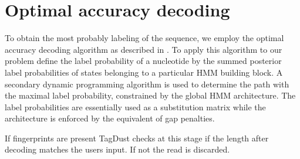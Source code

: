 \documentclass[11pt,a4paper,oneside]{book}
\begin{document}
\section{Optimal accuracy decoding} 

To obtain the most probably labeling of the sequence, we employ the optimal accuracy decoding algorithm as described in \citep{Kall:2005vg}. To apply this algorithm to our problem define the label probability of a nucleotide by the summed posterior label probabilities of states belonging to a particular HMM building block. A secondary dynamic programming algorithm is used to determine the path with the maximal label probability, constrained by the global HMM architecture. The label probabilities are essentially used as a substitution matrix while the architecture is enforced by the equivalent of gap penalties. 

If fingerprints are present TagDust checks at this stage if the length after decoding matches the users input. If not the read is discarded. 



\end{document}
